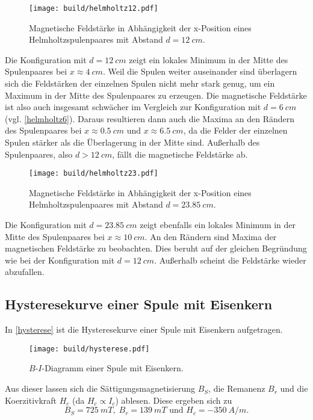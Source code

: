 \begin{figure}[H]
    \texttt{[image: build/helmholtz12.pdf]}
    \caption{Magnetische Feldstärke in Abhängigkeit der x-Position eines Helmholtzspulenpaares mit Abstand $d =\SI{12}{cm}$.}
    \label{helmholtz12}
\end{figure}
Die Konfiguration mit $d = \SI{12}{cm}$ zeigt ein lokales Minimum in der Mitte des Spulenpaares bei $x \approx \SI{4}{cm}$. Weil die Spulen weiter auseinander sind
überlagern sich die Feldstärken der einzelnen Spulen nicht mehr stark genug, um ein Maximum in der Mitte des Spulenpaares zu erzeugen. Die magnetische Feldstärke ist also auch insgesamt schwächer im Vergleich zur Konfiguration mit $d = \SI{6}{cm}$ (vgl. \autoref{helmholtz6}).
Daraus resultieren dann auch die Maxima an den Rändern des Spulenpaares bei $x \approx \SI{0.5}{cm}$ und $x \approx \SI{6.5}{cm}$, da die Felder der einzelnen Spulen stärker als die Überlagerung in der Mitte sind. Außerhalb des Spulenpaares, also $d > \SI{12}{cm}$, fällt die 
magnetische Feldstärke ab.

\begin{figure}[H]
    \texttt{[image: build/helmholtz23.pdf]}
    \caption{Magnetische Feldstärke in Abhängigkeit der x-Position eines Helmholtzspulenpaares mit Abstand $d =\SI{23.85}{cm}$.}
    \label{helmholtz23}
\end{figure}
Die Konfiguration mit $d = \SI{23.85}{cm}$ zeigt ebenfalls ein lokales Minimum in der Mitte des Spulenpaares bei $x \approx \SI{10}{cm}$. An den Rändern sind Maxima der magnetischen Feldstärke zu beobachten.
Dies beruht auf der gleichen Begründung wie bei der Konfiguration mit $d =\SI{12}{cm}$. Außerhalb scheint die Feldstärke wieder abzufallen.

\newpage
\subsection{Hysteresekurve einer Spule mit Eisenkern}
In \autoref{hysterese} ist die Hysteresekurve einer Spule mit Eisenkern aufgetragen.
\begin{figure}[H]
    \texttt{[image: build/hysterese.pdf]}
    \caption{$B$-$I$-Diagramm einer Spule mit Eisenkern.}
    \label{hysterese}
\end{figure}
Aus dieser lassen sich die Sättigungsmagnetisierung $B_S$, die Remanenz $B_r$ und
die Koerzitivkraft $H_c$ (da $H_c \propto I_c$) ablesen. Diese ergeben sich zu 
\begin{equation*}
    B_S = \SI{725}{mT},\;B_r = \SI{139}{mT} \text{ und } H_c = \SI{-350}{A/m}.
\end{equation*}














\newpage